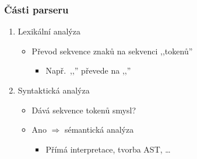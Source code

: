 \begin{frame}[fragile]
  \frametitle{Části parseru}

  

  \begin{enumerate}
    \item Lexikální analýza
    \begin{itemize}
      \item Převod sekvence znaků na sekvenci ,,tokenů''
      \begin{itemize}
	\item Např.\ ,,'' převede na ,,''
      \end{itemize}
    \end{itemize}

    \pause

    \item Syntaktická analýza
    \begin{itemize}
      \item Dává sekvence tokenů smysl?
      \item Ano $\Rightarrow$ sémantická analýza

      \begin{itemize}
	\item Přímá interpretace, tvorba AST, \dots
      \end{itemize}
    \end{itemize}

  \end{enumerate}

\end{frame}

